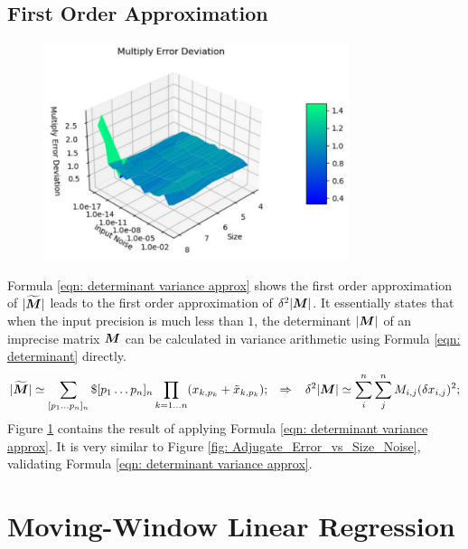 \documentclass[twoside]{article}
\numberwithin{equation}{section}
\newcommand{\eqspace}{\;\;\;}
\begin{document}
\subsection{First Order Approximation}

\begin{figure}[p]
\centering
\includegraphics[height=2.5in]{Multiply_Error_vs_Size_Noise.pdf} 
\label{fig: Multiply_Error_vs_Size_Noise}
\end{figure}

Formula \eqref{eqn: determinant variance approx} shows the first order approximation of $|\widetilde{\protect{\textrm{\boldmath $M$}}}|$ leads to the first order approximation of $\delta^2 |\protect{\textrm{\boldmath $M$}}|$.   
It essentially states that when the input precision is much less than $1$, the determinant $|\protect{\textrm{\boldmath $M$}}|$ of an imprecise matrix $\protect{\textrm{\boldmath $M$}}$ can be calculated in variance arithmetic using Formula \eqref{eqn: determinant} directly.
\begin{equation}
\label{eqn: determinant variance approx}
|\widetilde{\M}| \simeq \sum_{[p_1\dots p_n]_n} \$ [p_1\dots p_n]_n \prod_{k=1 \dots n} (x_{k,p_k} + \tilde{x}_{k,p_k}); \eqspace \Rightarrow  \eqspace
	\delta^2 |\M| \simeq \sum_{i}^{n} \sum_{j}^{n} M_{i,j} (\delta x_{i,j})^2;
\end{equation}
Figure \ref{fig: Multiply_Error_vs_Size_Noise} contains the result of applying Formula \eqref{eqn: determinant variance approx}.
It is very similar to Figure \ref{fig: Adjugate_Error_vs_Size_Noise}, validating Formula \eqref{eqn: determinant variance approx}.






\clearpage
\section{Moving-Window Linear Regression}
\label{sec: Moving-Window Linear Regression}
\end{document}
